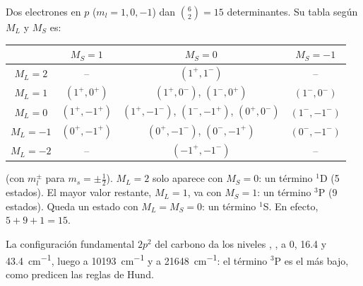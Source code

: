\begin{example}\label{ex:b3:many-electron-atoms:p2}
Dos electrones en $p$ ($m_l = 1, 0, -1$) dan $\binom62 = 15$ determinantes.
Su tabla según $M_L$ y $M_S$ es:
\begin{center}\small
\begin{tabular}{c|ccc}
\hline
 & $M_S = 1$ & $M_S = 0$ & $M_S = -1$\\ \hline
$M_L = 2$ & -- & $(1^+,1^-)$ & --\\
$M_L = 1$ & $(1^+,0^+)$ & $(1^+,0^-)$, $(1^-,0^+)$ & $(1^-,0^-)$\\
$M_L = 0$ & $(1^+,-1^+)$ & $(1^+,-1^-)$, $(1^-,-1^+)$, $(0^+,0^-)$ & $(1^-,-1^-)$\\
$M_L = -1$ & $(0^+,-1^+)$ & $(0^+,-1^-)$, $(0^-,-1^+)$ & $(0^-,-1^-)$\\
$M_L = -2$ & -- & $(-1^+,-1^-)$ & --\\ \hline
\end{tabular}
\end{center}
(con $m_l^\pm$ para $m_s = \pm\frac12$). $M_L = 2$ solo aparece con $M_S = 0$:
un término ${}^1$D (5 estados). El mayor valor restante, $M_L = 1$, va con
$M_S = 1$: un término ${}^3$P (9 estados). Queda un estado con $M_L = M_S = 0$: un
término ${}^1$S. En efecto, $5 + 9 + 1 = 15$.
\end{example}

\begin{example}\label{ex:b3:many-electron-atoms:carbon}
La configuración fundamental $2p^2$ del carbono da los niveles ,
,  a 0, 16.4 y \qty{43.4}{cm^{-1}}, luego
 a \qty{10193}{cm^{-1}} y  a
\qty{21648}{cm^{-1}}: el término ${}^3$P es el más bajo, como predicen las reglas de Hund.
\end{example}

